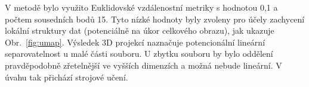 V metodě bylo využito Euklidovské vzdálenostní metriky s hodnotou 0,1 a počtem
sousedních bodů 15. Tyto nízké hodnoty byly zvoleny pro účely zachycení lokální
struktury dat (potenciálně na úkor celkového obrazu), jak ukazuje
Obr.~\ref{fig:umap}. Výsledek 3D projekcí naznačuje potencionální lineární
separovatelnost u malé části souboru. U zbytku souboru by bylo oddělení
pravděpodobně zřetelnější ve vyšších dimenzích a možná nebude lineární. V úvahu
tak přichází strojové učení.